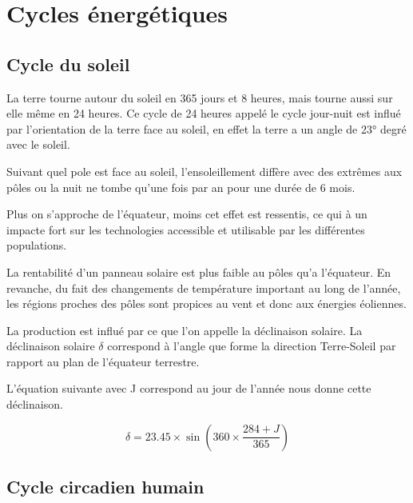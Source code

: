 \chapter{Cycles énergétiques}
\section{Cycle du soleil}

La terre tourne autour du soleil en 365 jours et 8 heures, mais tourne aussi sur elle même en 24 heures.
Ce cycle de 24 heures appelé le cycle jour-nuit est influé par l'orientation de la terre face au soleil,
en effet la terre a un angle de 23° degré avec le soleil.

Suivant quel pole est face au soleil, l'ensoleillement diffère avec des extrêmes aux pôles ou la nuit ne tombe
qu'une fois par an pour une durée de 6 mois.

Plus on s'approche de l'équateur, moins cet effet est ressentis, ce qui à un impacte fort sur les technologies
accessible et utilisable par les différentes populations.

La rentabilité d'un panneau solaire est plus faible au pôles qu'a l'équateur.
En revanche, du fait des changements de température important au long de l'année, les régions proches des pôles
sont propices au vent et donc aux énergies éoliennes.

La production est influé par ce que l'on appelle la déclinaison solaire.
La déclinaison solaire $\delta$ correspond à l’angle que forme la direction
Terre-Soleil par rapport au plan de l’équateur terrestre.

L'équation suivante avec J correspond au jour de l'année nous donne cette déclinaison.

\begin{equation}
  \delta = 23.45 \times \sin \left( 360 \times \frac{284 + J}{365} \right)
\end{equation}


\section{Cycle circadien humain}

